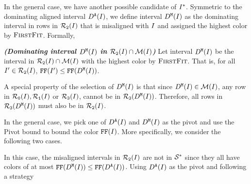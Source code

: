 
In the general case, we have another possible candidate of $I^*$.
Symmetric to the dominating aligned interval $D^\texttt{A}(I)$, we define interval $D^\texttt{M}(I)$ as the dominating interval in rows in $\mathcal{R}_\texttt{2}(I)$ that is misaligned with $I$ and assigned the highest color by $\textsc{FirstFit}$.
Formally,

\begin{definition}
    \shortversion{\label{def:z_short}}
    \fullversion{\label{def:z}}
    \emph{\textbf{(Dominating interval $D^\texttt{M}(I)$ in $\mathcal{R}_\texttt{2}(I)\cap\mathcal{M}(I)$)}}
    Let interval $D^\texttt{M}(I)$ be the interval in $\mathcal{R}_\texttt{2}(I)\cap\mathcal{M}(I)$ with the highest color by $\textsc{FirstFit}$. That is, for all $I^\prime \in \mathcal{R}_\texttt{2}(I)$, $\text{\texttt{FF}}(I^\prime) \leq \text{\texttt{FF}}(D^\texttt{M}(I))$.
\end{definition}

A special property of the selection of $D^\texttt{M}(I)$ is that since $D^\texttt{M}(I) \in \mathcal{M}(I)$, any row in $\mathcal{R}_\texttt{0}(I), \mathcal{R}_\texttt{1}(I)$ or $\mathcal{R}_\texttt{3}(I)$, cannot be in $\mathcal{R}_\texttt{3}(D^\texttt{M}(I))$.
Therefore, all rows in $\mathcal{R}_\texttt{3}(D^\texttt{M}(I))$ must also be in $\mathcal{R}_\texttt{2}(I)$.


In the general case, we pick one of $D^\texttt{A}(I)$ and $D^\texttt{M}(I)$ as the pivot and use the Pivot bound to bound the color $\text{\texttt{FF}}(I)$.
More specifically, we consider the following two cases.



In this case, the misaligned intervals in $\mathcal{R}_\texttt{2}(I)$ are not in $\mathcal{S}^*$ since they all have colors of at most $\text{\texttt{FF}}(D^\texttt{M}(I)) \leq \text{\texttt{FF}}(D^\texttt{A}(I))$.
Using $D^\texttt{A}(I)$ as the pivot and following a strategy\shortversion{: }

